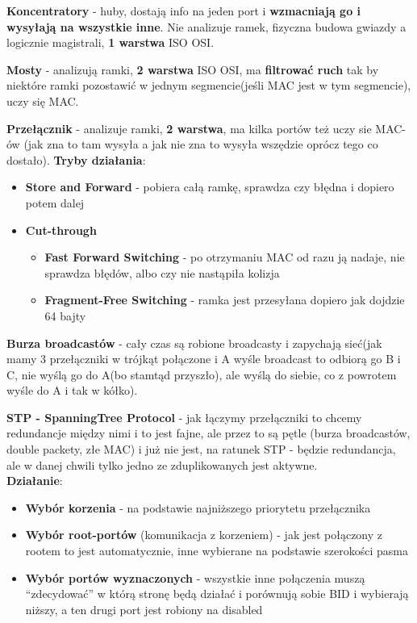 \documentclass[../main.tex]{subfiles}
\begin{document}
    \textbf{Koncentratory} - huby, dostają info na jeden port i \textbf{wzmacniają go i wysyłają na
    wszystkie inne}. Nie analizuje ramek, fizyczna budowa gwiazdy a logicznie magistrali,
    \textbf{1 warstwa} ISO OSI.

    \textbf{Mosty} - analizują ramki, \textbf{2 warstwa} ISO OSI, ma \textbf{filtrować ruch} tak by niektóre
    ramki pozostawić w jednym segmencie(jeśli MAC jest w tym segmencie), uczy się MAC.

    \textbf{Przełącznik} - analizuje ramki, \textbf{2 warstwa}, ma kilka portów też uczy sie
    MAC-ów (jak zna to tam wysyła a jak nie zna to wysyła wszędzie oprócz tego co dostało).
    \textbf{Tryby działania}:
    \begin{itemize}
        \item \textbf{Store and Forward} - pobiera całą ramkę, sprawdza czy błędna i dopiero potem dalej
        \item \textbf{Cut-through}
        \begin{itemize}
            \item \textbf{Fast Forward Switching} - po otrzymaniu MAC od razu ją nadaje, nie sprawdza błędów, albo czy nie nastąpiła kolizja
            \item \textbf{Fragment-Free Switching} - ramka jest przesyłana dopiero jak dojdzie 64 bajty
        \end{itemize}
    \end{itemize}

    \textbf{Burza broadcastów} - cały czas są robione broadcasty i zapychają sieć(jak mamy
    3 przełączniki w trójkąt połączone i A wyśle broadcast to odbiorą go B i C, nie wyślą go do
    A(bo stamtąd przyszło), ale wyślą do siebie, co z powrotem wyśle do A i tak w kółko).

    \textbf{STP - SpanningTree Protocol} - jak łączymy przełączniki to chcemy
    redundancje między nimi i to jest fajne, ale przez to są pętle (burza broadcastów,
    double packety, złe MAC) i już nie jest, na ratunek STP - będzie redundancja, ale w
    danej chwili tylko jedno ze zduplikowanych jest aktywne.\\
    \textbf{Działanie}:
    \begin{itemize}
        \item \textbf{Wybór korzenia} - na podstawie najniższego priorytetu przełącznika
        \item \textbf{Wybór root-portów} (komunikacja z korzeniem) - jak jest połączony z rootem to jest automatycznie, inne wybierane na podstawie szerokości pasma
        \item \textbf{Wybór portów wyznaczonych} - wszystkie inne połączenia muszą “zdecydować” w którą stronę będą działać i porównują sobie BID i wybierają niższy, a ten drugi port jest robiony na disabled
    \end{itemize}
\end{document}
